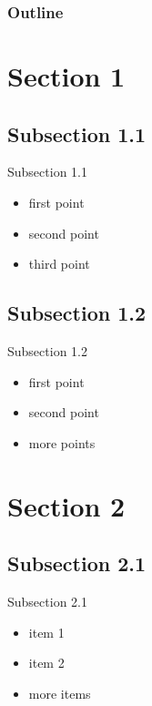 \titlepageframe %

\begin{frame}
	\frametitle{Outline}
	\tableofcontents
\end{frame}

\section{Section 1}
	\subsection{Subsection 1.1}
		\begin{tframe}{Subsection 1.1}
			\begin{itemize}
			    \item{first point}
			    \item{second point}
			    \item{third point}
			\end{itemize}
		\end{tframe}
	\subsection{Subsection 1.2}
		\begin{tframe}{Subsection 1.2}
			\begin{itemize}
				\item first point
				\item second point
				\item more points
			\end{itemize}
		\end{tframe}

\section{Section 2}
	\subsection{Subsection 2.1}
		\begin{tframe}{Subsection 2.1}
			\begin{itemize}
				\item{item 1}
				\item{item 2}
				\item{more items}
			\end{itemize}
		\end{tframe}

